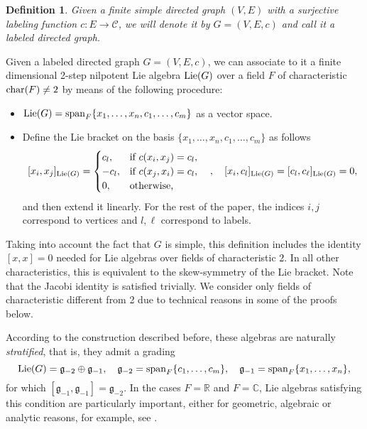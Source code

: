 \documentclass[12pt]{amsart}
\newtheorem{defn}[teo]{Definition}
\begin{document}
\begin{defn}
Given a finite simple directed graph $(V,E)$ with a surjective labeling function $c\colon E\to \mathcal{C}$, we will denote it by $G=(V,E,c)$ and call it a \emph{labeled directed graph}.
\end{defn}

Given a labeled directed graph $G=(V,E,c)$, we can associate to it a finite dimensional 2-step nilpotent Lie algebra ${\rm Lie}(G)$ over a field $F$ of characteristic ${\rm char}(F)\neq2$ by means of the following procedure:

\begin{itemize}
\item ${\rm Lie}(G)={\rm span}_F\{x_1,\dotsc,x_n,c_1,\dots,c_m\}$ as a vector space.
\item Define the Lie bracket on the basis $\{x_1,\dotsc,x_n,c_1,\dots,c_m\}$ as follows
\[
[x_i,x_j]_{{\rm Lie}(G)}=\begin{cases}c_l,&\mbox{if }c(x_i,x_j)=c_l,\\-c_l,&\mbox{if }c(x_j,x_i)=c_l,\\0,&\mbox{otherwise,}\end{cases}\quad,\quad [x_i,c_l]_{{\rm Lie}(G)}=[c_l,c_\ell]_{{\rm Lie}(G)}=0,
\]
and then extend it linearly. For the rest of the paper, the indices $i,j$ correspond to vertices and $l,\ell$ correspond to labels.
\end{itemize}
Taking into account the fact that $G$ is simple, this definition includes the identity $[x,x]=0$ needed for Lie algebras over fields of characteristic 2. In all other characteristics, this is equivalent to the skew-symmetry of the Lie bracket. Note that the Jacobi identity is satisfied trivially. We consider only fields of characteristic different from 2 due to technical reasons in some of the proofs below.

According to the construction described before, these algebras are naturally {\em stratified}, that is, they admit a grading
\[
{\rm Lie}(G)={\mathfrak{g}}_{-2}\oplus{\mathfrak{g}}_{-1},\quad {\mathfrak{g}}_{-2}={\rm span}_F\{c_1,\dots,c_m\},\quad {\mathfrak{g}}_{-1}={\rm span}_F\{x_1,\dotsc,x_n\},
\]
for which $[{\mathfrak{g}}_{-1},{\mathfrak{g}}_{-1}]={\mathfrak{g}}_{-2}$. In the cases $F={\mathbb R}$ and $F={\mathbb C}$, Lie algebras satisfying this condition are particularly important, either for geometric, algebraic or analytic reasons, for example, see \cite{bon,nico,ben}.
\end{document}
